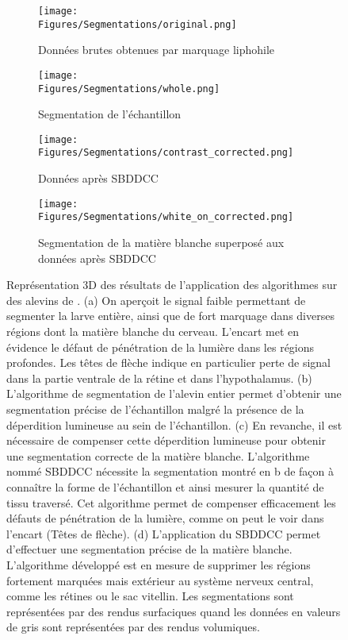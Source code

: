 \documentclass[\main/main.tex]{subfiles}
\begin{document}
\begin{figure}[!h]
    \centering
    \begin{subfigure}[b]{0.45\textwidth}
       \caption{
            \label{fig:lempereur_info:brut}
            Données brutes obtenues par marquage liphohile
            }
       \centering \texttt{[image: \\Figures/Segmentations/original.png]}
    \end{subfigure}
    \begin{subfigure}[b]{0.45\textwidth}
       \caption{
        \label{fig:lempereur_info:whole}
        Segmentation de l'échantillon
        }
       \centering \texttt{[image: \\Figures/Segmentations/whole.png]}
    \end{subfigure}
    \begin{subfigure}[b]{0.45\textwidth}
       \caption{
           \label{fig:lempereur_info:correction}
           Données après SBDDCC
        }
       \centering \texttt{[image: \\Figures/Segmentations/contrast\_corrected.png]}
    \end{subfigure}
    \begin{subfigure}[b]{0.45\textwidth}
       \caption{
           \label{fig:lempereur_info:white}
            Segmentation de la matière blanche superposé aux données après SBDDCC
            }
       \centering \texttt{[image: \\Figures/Segmentations/white\_on\_corrected.png]}
    \end{subfigure}
    \caption{
        \label{fig:lempereur_info}
        Représentation 3D des résultats de l'application des algorithmes sur des alevins de \pz{}.
        \newline
        (a) On aperçoit le signal faible permettant de segmenter la larve entière, ainsi que de fort marquage dans diverses régions dont la matière blanche du cerveau. L'encart met en évidence le défaut de pénétration de la lumière dans les régions profondes. Les têtes de flèche indique en particulier  perte de signal dans la partie ventrale de la rétine et dans l'hypothalamus.
        (b) L'algorithme de segmentation de l'alevin entier permet d'obtenir une segmentation précise de l'échantillon malgré la présence de la déperdition lumineuse au sein de l'échantillon.
        (c)
        En revanche, il est nécessaire de compenser cette déperdition lumineuse pour obtenir une segmentation correcte de la matière blanche. L'algorithme nommé SBDDCC nécessite la segmentation  montré en b de façon à connaître la forme de l'échantillon et ainsi mesurer la quantité de tissu traversé.
        Cet algorithme permet de compenser efficacement les défauts de pénétration de la lumière, comme on peut le voir dans l'encart (Têtes de flèche).
        (d) L'application du SBDDCC permet d'effectuer une segmentation précise de la matière blanche. L'algorithme développé est en mesure de supprimer les régions fortement marquées mais extérieur au système nerveux central, comme les rétines ou le sac vitellin.
        \newline
        Les segmentations sont représentées par des rendus surfaciques quand les données en valeurs de gris sont représentées par des rendus volumiques.
    }
    
\end{figure}
\end{document}
